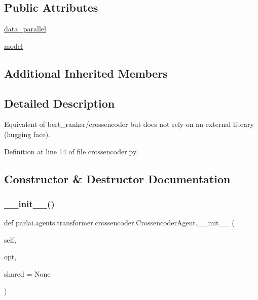 \subsection*{Public Attributes}
\begin{DoxyCompactItemize}
\item 
\hyperlink{classparlai_1_1agents_1_1transformer_1_1crossencoder_1_1CrossencoderAgent_a991c76bbbb234ba482e3eaf3b6813bc8}{data\+\_\+parallel}
\item 
\hyperlink{classparlai_1_1agents_1_1transformer_1_1crossencoder_1_1CrossencoderAgent_a53447e9640405f06d1458eec65db5525}{model}
\end{DoxyCompactItemize}
\subsection*{Additional Inherited Members}


\subsection{Detailed Description}
\begin{DoxyVerb}Equivalent of bert_ranker/crossencoder but does not rely on an external
    library (hugging face).
\end{DoxyVerb}
 

Definition at line 14 of file crossencoder.\+py.



\subsection{Constructor \& Destructor Documentation}
\mbox{\label{classparlai_1_1agents_1_1transformer_1_1crossencoder_1_1CrossencoderAgent_a22295a739ff290d96c45efd0bfd550bb}} 
\subsubsection{\texorpdfstring{\+\_\+\+\_\+init\+\_\+\+\_\+()}{\_\_init\_\_()}}
{\footnotesize\ttfamily def parlai.\+agents.\+transformer.\+crossencoder.\+Crossencoder\+Agent.\+\_\+\+\_\+init\+\_\+\+\_\+ (\begin{DoxyParamCaption}\item[{}]{self,  }\item[{}]{opt,  }\item[{}]{shared = {\ttfamily None} }\end{DoxyParamCaption})}



